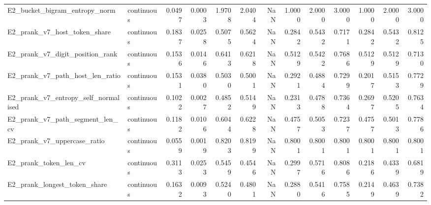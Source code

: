 \begin{tabular}{llrrrrrrrrrrr}
E2\_bucket\_bigram\_entropy\_norm & continuous & 0.0497 & 0.0003 & 1.9708 & 2.0404 & NaN & 1.0000 & 2.0000 & 3.0000 & 1.0000 & 2.0000 & 3.0000 \\
E2\_prank\_v7\_host\_token\_share & continuous & 0.1837 & 0.0258 & 0.5075 & 0.5624 & NaN & 0.2842 & 0.5432 & 0.7171 & 0.2842 & 0.5432 & 0.8125 \\
E2\_prank\_v7\_digit\_position\_rank & continuous & 0.1536 & 0.0146 & 0.6413 & 0.6218 & NaN & 0.5129 & 0.5422 & 0.7686 & 0.5129 & 0.5129 & 0.7130 \\
E2\_prank\_v7\_path\_host\_len\_ratio & continuous & 0.1531 & 0.0380 & 0.5030 & 0.5001 & NaN & 0.2921 & 0.4884 & 0.7299 & 0.2017 & 0.5153 & 0.7729 \\
E2\_prank\_v7\_entropy\_self\_normalised & continuous & 0.1022 & 0.0027 & 0.4852 & 0.5149 & NaN & 0.2313 & 0.4788 & 0.7364 & 0.2697 & 0.5205 & 0.7634 \\
E2\_prank\_v7\_path\_segment\_len\_cv & continuous & 0.1182 & 0.0106 & 0.6044 & 0.6228 & NaN & 0.4757 & 0.5053 & 0.7237 & 0.4757 & 0.5013 & 0.7786 \\
E2\_prank\_v7\_uppercase\_ratio & continuous & 0.0559 & 0.0019 & 0.8203 & 0.8199 & NaN & 0.8001 & 0.8001 & 0.8001 & 0.8001 & 0.8001 & 0.8001 \\
E2\_prank\_token\_len\_cv & continuous & 0.3113 & 0.0253 & 0.5459 & 0.4546 & NaN & 0.2997 & 0.5716 & 0.8086 & 0.2186 & 0.4339 & 0.6819 \\
E2\_prank\_longest\_token\_share & continuous & 0.1632 & 0.0093 & 0.5240 & 0.4801 & NaN & 0.2880 & 0.5416 & 0.7585 & 0.2149 & 0.4639 & 0.7382 \\
\bottomrule
\end{tabular}
